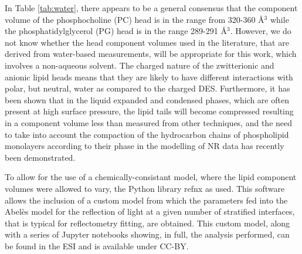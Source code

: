 \documentclass[twoside,twocolumn,9pt]{article}
\begin{document}
In Table \ref{tab:water}, there appears to be a general consensus that the component volume of the phosphocholine (PC) head is in the range from 320-360 \AA$^3$ while the phosphatidylglycerol (PG) head is in the range 289-291 \AA$^3$. However, we do not know whether the head component volumes used in the literature, that are derived from water-based measurements, will be appropriate for this work, which involves a non-aqueous solvent. The charged nature of the zwitterionic and anionic lipid heads means that they are likely to have different interactions with polar, but neutral, water as compared to the charged DES.\cite{Sanchez-Fernandez2018} Furthermore, it has been shown that in the liquid expanded and condensed phases, which are often present at high surface pressure, the lipid tails will become compressed resulting in a component volume less than measured from other techniques,\cite{Marsh2010,Small1984} and the need to take into account the compaction of the hydrocarbon chains of phospholipid monolayers according to their phase in the modelling of NR data has recently been demonstrated.\cite{Campbell2018}

To allow for the use of a chemically-consistant model, where the lipid component volumes were allowed to vary, the Python library refnx\cite{Nelson2018} as used. This software allows the inclusion of a custom model from which the parameters fed into the Abel\`{e}s model for the reflection of light at a given number of stratified interfaces,\cite{Abeles1950,Parratt1954} that is typical for reflectometry fitting, are obtained. This custom model, along with a series of Jupyter notebooks showing, in full, the analysis performed, can be found in the ESI and is available under CC-BY.\cite{mccluskey_2018}
\end{document}
